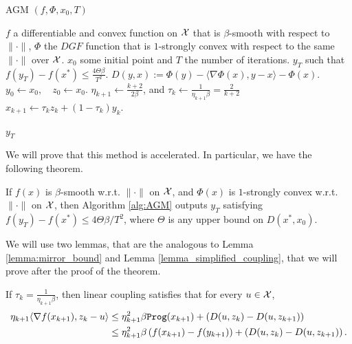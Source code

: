 \begin{algorithm}[H]
\scriptsize
\caption{AGM $(f, \Phi, x_0, T)$}
   \label{alg:AGM}
   \begin{algorithmic}[1]
   \REQUIRE $f$ a differentiable and convex function on $\mathcal{X}$ that is $\beta$-smooth with respect to $\|\cdot\|$, $\Phi$ the $DGF$ function that is $1$-strongly convex with respect to the same $\|\cdot\|$ over $\mathcal{X}$. $x_0$ some initial point and $T$ the number of iterations.
   \ENSURE $y_T$ such that $f(y_T) -f(x^\ast) \leq \frac{4\Theta \beta}{T^2}$.
   \STATE $D(y, x) := \Phi(y) - \langle \nabla \Phi(x), y-x\rangle - \Phi(x).$
   \STATE $y_0 \gets x_0, \quad z_0 \gets x_0$.
       \STATE $\eta_{k+1} \gets \frac{k+2}{2\beta}$, and $\tau_k \gets \frac{1}{\eta_{k+1}\beta} = \frac{2}{k+2}$
       \STATE $x_{k+1} \gets \tau_k z_k + (1-\tau_k)y_k$.

   \ENDFOR
    $y_T$
\end{algorithmic}
\end{algorithm}

We will prove that this method is accelerated. In particular, we have the following theorem.

\begin{theorem}\label{thm:linear_coupling}
    If $f(x)$ is $\beta$-smooth w.r.t. $\|\cdot\|$ on $\mathcal{X}$, and $\Phi(x)$ is $1$-strongly convex w.r.t. $\|\cdot\|$ on $\mathcal{X}$, then Algorithm \ref{alg:AGM} outputs $y_T$ satisfying $f(y_T) - f(x^\ast) \leq 4 \Theta \beta /T^2$, where $\Theta$ is any upper bound on $D(x^\ast, x_0)$.
\end{theorem}

We will use two lemmas, that are the analogous to Lemma \ref{lemma:mirror_bound} and Lemma \ref{lemma_simplified_coupling}, that we will prove after the proof of the theorem.

\begin{lemma}\label{lemma:mirror_bound_general}
    If $\tau_k = \frac{1}{\eta_{k+1}\beta}$, then linear coupling satisfies that for every $u \in \mathcal{X}$,
    \begin{align*}
        \begin{aligned}
            \eta_{k+1} \langle \nabla f(x_{k+1}), z_{k} - u \rangle &\leq \eta^2_{k+1}\beta {\tt{Prog}}(x_{k+1}) + \left( D(u, z_k) - D(u, z_{k+1})\right) \\
                                                                &\leq \eta_{k+1}^2\beta \left( f(x_{k+1}) - f(y_{k+1})\right) + \left( D(u, z_k) - D(u, z_{k+1})\right).
        \end{aligned}
    \end{align*}
\end{lemma}

